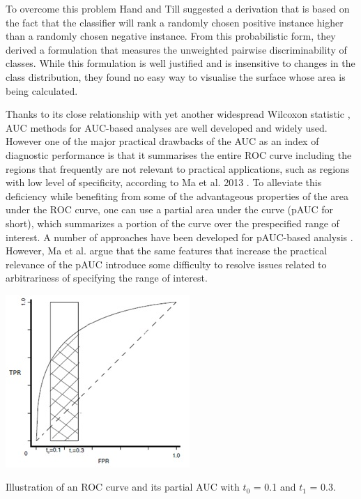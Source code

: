 To overcome this problem Hand and Till \citep{hand2001aucmulticlass} suggested a derivation that is based on the fact that the classifier will rank a randomly chosen positive instance higher than a randomly chosen negative instance. From this probabilistic form, they derived a formulation that measures the unweighted pairwise discriminability of classes. While this formulation is well justified and is insensitive to changes in the class distribution, they found no easy way to visualise the surface whose area is being calculated.

Thanks to its close relationship with yet another widespread Wilcoxon statistic \citep{hanley1982useauc}, AUC methods for AUC-based analyses are well developed and widely used. However one of the major practical drawbacks of the AUC as an index of diagnostic performance is that it summarises the entire ROC curve including the regions that frequently are not relevant to practical applications, such as regions with low level of specificity, according to Ma et al. 2013 \citep{ma2013paucdiagperf}. To alleviate this deficiency while benefiting from some of the advantageous properties of the area under the ROC curve, one can use a partial area under the curve (pAUC for short), which summarizes a portion of the curve over the prespecified range of interest. A number of approaches have been developed for pAUC-based analysis \citep{dodd2003pauc,he2010nonparagenomic,mcclish1989paucanal,zhang2002nonparpaucapp}. However, Ma et al. argue that the same features that increase the practical relevance of the pAUC introduce some difficulty to resolve issues related to arbitrariness of specifying the range of interest. 

\begin{marginfigure}
	\includegraphics{roc_curves/Figure4.png}
	\caption{Illustration of an ROC curve and its partial AUC with $t_{0}$ = 0.1 and $t_{1}$ = 0.3.}
	\label{fig:partial-auc}
\end{marginfigure}


